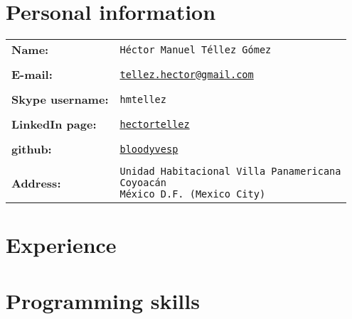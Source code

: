 \documentclass[a5paper,oneside]{amsart}
\theoremstyle{definition}
\numberwithin{equation}{subsection}
\begin{document}
    \section{Personal information}
        
        \begin{tabular}{lp{15cm}}
                \textbf{Name:}              &   \texttt{H\'ector Manuel T\'ellez G\'omez}                                                           \\
                &\\
                \textbf{E-mail:}            &   \texttt{\href{mailto: tellez.hector@gmail.com}{tellez.hector@gmail.com}}                                                                  \\
                &\\
                \textbf{Skype username:}    &   \texttt{hmtellez}                                                                                   \\
                &\\
                \textbf{LinkedIn page:}     &   \texttt{\href{http://www.linkedin.com/in/hectortellez}{hectortellez}}                               \\
                &\\
                \textbf{github:}            &   \texttt{\href{https://github.com/bloodyvesp}{bloodyvesp}}                                           \\
                &\\
                \textbf{Address:}           &   \parbox{15cm}{
                                                    \texttt{Unidad Habitacional Villa Panamericana                  \\
                                                            Coyoac\'an                                              \\
                                                            México D.F. (Mexico City)}}                                                                 \\
        \end{tabular}
        
    
    \newpage
    \section{Experience}    

    \newpage        
    \section{Programming skills}
\end{document}
